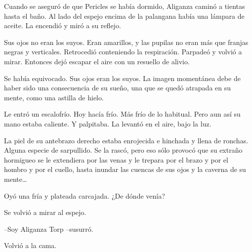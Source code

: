 \mbox{}

\centerline{ \Huge *}

\mbox{}



Cuando se aseguró de que Pericles se había dormido, Aliganza caminó a tientas hasta el baño. Al lado del espejo encima de la palangana había una lámpara de aceite. La encendió y miró a su reflejo.

Sus ojos no eran los suyos. Eran amarillos, y las pupilas no eran más que franjas negras y verticales. Retrocedió conteniendo la respiración. Parpadeó y volvió a mirar. Entonces dejó escapar el aire con un resuello de alivio.

Se había equivocado. Sus ojos eran los suyos. La imagen momentánea debe de haber sido una consecuencia de su sueño, una que se quedó atrapada en su mente, como una astilla de hielo.

Le entró un escalofrío. Hoy hacía frío. Más frío de lo habitual. Pero aun así su mano estaba caliente. Y palpitaba. La levantó en el aire, bajo la luz.

La piel de su antebrazo derecho estaba enrojecida e hinchada y llena de ronchas. Alguna especie de sarpullido. Se la rascó, pero eso sólo provocó que su extraño hormigueo se le extendiera por las venas y le trepara por el brazo y por el hombro y por el cuello, hasta inundar las cuencas de sus ojos y la caverna de su mente…

Oyó una fría y plateada carcajada. ¿De dónde venía?

Se volvió a mirar al espejo.

--Soy Aliganza Torp --susurró.

Volvió a la cama.

